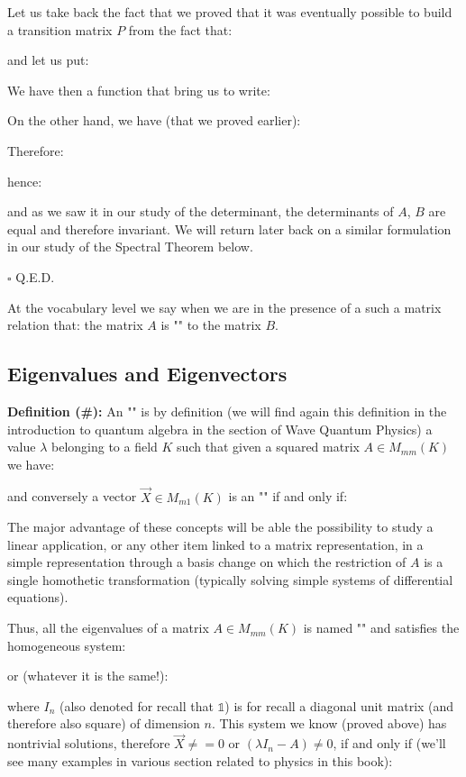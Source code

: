 	\begin{dem}
	Let us take back the fact that we proved that it was eventually possible to build a transition matrix $P$ from the fact that:
	
	and let us put:
	
	We have then a function that bring us to write:
	
	On the other hand, we have (that we proved earlier):
	
	Therefore:
	
	hence:
	
	and as we saw it in our study of the determinant, the determinants of $A$, $B$ are equal and therefore invariant. We will  return later back on a similar formulation in our study of the Spectral Theorem below.
	\begin{flushright}
		$\square$  Q.E.D.
	\end{flushright}
	\end{dem}
	At the vocabulary level we say when we are in the presence of a such a matrix relation that: the matrix $A$ is "" to the matrix $B$.
	
	\pagebreak
	\subsection{Eigenvalues and Eigenvectors}
	\textbf{Definition (\#\mydef):} An "" is by definition (we will find again this definition in the introduction to quantum algebra in the section of Wave Quantum Physics) a value $\lambda$ belonging to a field $K$ such that given a squared matrix $A\in M_{mm}(K)$ we have:
	
	and conversely a vector $\vec{X}\in M_{m1}(K)$ is an "" if and only if:
	
	The major advantage of these concepts will be able the possibility to study a linear application, or any other item linked to a matrix representation, in a simple representation through a basis change on which the restriction of $A$ is a single homothetic transformation (typically solving simple systems of differential equations).
	
	Thus, all the eigenvalues of a matrix $A\in M_{mm}(K)$ is named "" and satisfies the homogeneous system:
	
	or (whatever it is the same!):
	
	where $I_n$ (also denoted for recall that $\mathds{1}$) is for recall a diagonal unit matrix (and therefore also square) of dimension $n$. This system we know (proved above) has nontrivial solutions, therefore $\vec{X} \neq=0$ or $(\lambda I_n-A)\neq 0$, if and only if (we'll see many examples in various section related to physics in this book):
	
